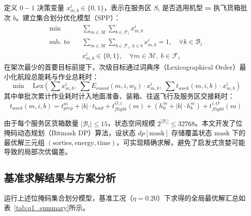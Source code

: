定义 $0-1$ 决策变量 $x_{m, b}^i \in \{0, 1\}$，表示在服务区 $S_i$ 是否选用机型 $m$ 执飞货箱批次 $b$。建立集合划分优化模型（SPP）：
\begin{align}
    \min \quad & \sum_{m \in \mathcal{M}} \sum_{b \in \mathcal{F}_i} x_{m, b}^i \label{eq:spp_obj1} \\
    \text{sub. to} \quad & \sum_{m \in \mathcal{M}} \sum_{b \in \mathcal{F}_i, \, k \in b} x_{m, b}^i = 1, \quad \forall k \in \mathcal{B}_i \label{eq:spp_cover} \\
    & x_{m, b}^i \in \{0, 1\}, \quad \forall m \in \mathcal{M}, \; b \in \mathcal{F}_i
\end{align}
在架次最少的首要目标前提下，次级目标通过词典序（Lexicographical Order）最小化航段总能耗与作业总耗时：
\begin{equation}
    \min \quad \text{Lex} \left( \sum x_{m,b}^i, \; \sum E_{round}(m, i, w_b) \cdot x_{m,b}^i, \; \sum t_{work}(m, i, b) \cdot x_{m,b}^i \right)
\end{equation}
其中单批次累计作业耗时计入地面准备、装箱、往返飞行及服务区交接耗时：
\begin{equation}
    t_{work}(m, i, b) = t_{prep}^m + |b| \cdot t_{load} + t_{flight}^{O,i}(m) + \left(h_0^m + |b| \cdot h_b^m\right) + t_{flight}^{i,O}(m)
\end{equation}

由于每个服务区货箱数量 $|\mathcal{B}_i| \le 15$，状态空间规模 $2^{|\mathcal{B}_i|} \le 32768$。本文开发了位掩码动态规划（Bitmask DP）算法，设状态 $dp[\text{mask}]$ 存储覆盖状态 $\text{mask}$ 下的最优解三元组 $(\text{sorties}, \text{energy}, \text{time})$，可实现精确求解，避免了启发式贪婪可能导致的局部次优偏差。

\subsection{基准求解结果与方案分析}

运行上述位掩码集合划分模型，基准工况（$\eta=0.20$）下求得的全局最优解汇总如表~\ref{tab:q1_summary}所示。

